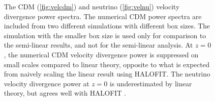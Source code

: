 \documentclass[twocolumn,superscriptaddress,prd]{revtex4}
\newcommand{\halofit}{HALOFIT }
\newcommand{\halofitns}{HALOFIT}
\begin{document}
\begin{figure}[h!]
  \centering
  \caption{The CDM
    (\ref{fig:velcdm}) and neutrino (\ref{fig:velnu}) velocity
      divergence power
      spectra.
      The numerical CDM
      power spectra are included from two
      different simulations with different box sizes.  The
      simulation with the smaller box size is used only for comparison to
      the semi-linear results, and not for the semi-linear analysis.  
      At $z=0$, the
      numerical CDM velocity divergence power is
      suppressed on small scales compared to
      linear theory, opposite to what is
      expected from naively scaling the linear result using \halofitns.
      The neutrino velocity divergence power at $z=0$ is
      underestimated by linear theory, but agrees well
      with \halofit.   
}\label{fig:vel}
\end{figure}
\end{document}
